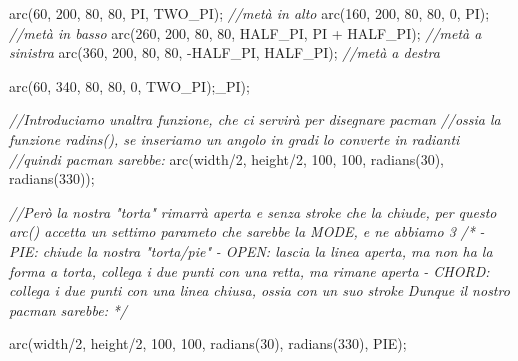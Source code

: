 \documentclass[
]{article}
\newenvironment{Shaded}{}{}
\newcommand{\CommentTok}[1]{\textcolor[rgb]{0.38,0.63,0.69}{\textit{#1}}}
\newcommand{\DecValTok}[1]{\textcolor[rgb]{0.25,0.63,0.44}{#1}}
\newcommand{\FunctionTok}[1]{\textcolor[rgb]{0.02,0.16,0.49}{#1}}
\newcommand{\NormalTok}[1]{#1}
\newcommand{\OperatorTok}[1]{\textcolor[rgb]{0.40,0.40,0.40}{#1}}
\begin{document}
\begin{Shaded}
\begin{Highlighting}[]
\FunctionTok{arc}\OperatorTok{(}\DecValTok{60}\OperatorTok{,} \DecValTok{200}\OperatorTok{,} \DecValTok{80}\OperatorTok{,} \DecValTok{80}\OperatorTok{,}\NormalTok{ PI}\OperatorTok{,}\NormalTok{ TWO\_PI}\OperatorTok{);} \CommentTok{//metà in alto}
\FunctionTok{arc}\OperatorTok{(}\DecValTok{160}\OperatorTok{,} \DecValTok{200}\OperatorTok{,} \DecValTok{80}\OperatorTok{,} \DecValTok{80}\OperatorTok{,} \DecValTok{0}\OperatorTok{,}\NormalTok{ PI}\OperatorTok{);} \CommentTok{//metà in basso}
\FunctionTok{arc}\OperatorTok{(}\DecValTok{260}\OperatorTok{,} \DecValTok{200}\OperatorTok{,} \DecValTok{80}\OperatorTok{,} \DecValTok{80}\OperatorTok{,}\NormalTok{ HALF\_PI}\OperatorTok{,}\NormalTok{ PI }\OperatorTok{+}\NormalTok{ HALF\_PI}\OperatorTok{);} \CommentTok{//metà a sinistra}
\FunctionTok{arc}\OperatorTok{(}\DecValTok{360}\OperatorTok{,} \DecValTok{200}\OperatorTok{,} \DecValTok{80}\OperatorTok{,} \DecValTok{80}\OperatorTok{,} \OperatorTok{{-}}\NormalTok{HALF\_PI}\OperatorTok{,}\NormalTok{ HALF\_PI}\OperatorTok{);} \CommentTok{//metà a destra}

\FunctionTok{arc}\OperatorTok{(}\DecValTok{60}\OperatorTok{,} \DecValTok{340}\OperatorTok{,} \DecValTok{80}\OperatorTok{,} \DecValTok{80}\OperatorTok{,} \DecValTok{0}\OperatorTok{,}\NormalTok{ TWO\_PI}\OperatorTok{);}\NormalTok{\_PI)}\OperatorTok{;}


\CommentTok{//Introduciamo un\textquotesingle{}altra funzione, che ci servirà per disegnare pacman}
\CommentTok{//ossia la funzione \textquotesingle{}radins()\textquotesingle{}, se inseriamo un angolo in gradi lo converte in radianti}
\CommentTok{//quindi pacman sarebbe:}
\FunctionTok{arc}\OperatorTok{(}\NormalTok{width}\OperatorTok{/}\DecValTok{2}\OperatorTok{,}\NormalTok{ height}\OperatorTok{/}\DecValTok{2}\OperatorTok{,} \DecValTok{100}\OperatorTok{,} \DecValTok{100}\OperatorTok{,} \FunctionTok{radians}\OperatorTok{(}\DecValTok{30}\OperatorTok{),} \FunctionTok{radians}\OperatorTok{(}\DecValTok{330}\OperatorTok{));}


\CommentTok{//Però la nostra "torta" rimarrà aperta e senza stroke che la chiude, per questo \textquotesingle{}arc()\textquotesingle{} accetta un settimo parameto che sarebbe la MODE, e ne abbiamo 3}
\CommentTok{/*}
\CommentTok{{-} PIE: chiude la nostra "torta/pie"}
\CommentTok{{-} OPEN: lascia la linea aperta, ma non ha la forma a torta, collega i due punti con una retta, ma rimane aperta}
\CommentTok{{-} CHORD: collega i due punti con una linea chiusa, ossia con un suo stroke}
\CommentTok{Dunque il nostro pacman sarebbe:}
\CommentTok{*/}

\FunctionTok{arc}\OperatorTok{(}\NormalTok{width}\OperatorTok{/}\DecValTok{2}\OperatorTok{,}\NormalTok{ height}\OperatorTok{/}\DecValTok{2}\OperatorTok{,} \DecValTok{100}\OperatorTok{,} \DecValTok{100}\OperatorTok{,} \FunctionTok{radians}\OperatorTok{(}\DecValTok{30}\OperatorTok{),} \FunctionTok{radians}\OperatorTok{(}\DecValTok{330}\OperatorTok{),}\NormalTok{ PIE}\OperatorTok{);}
\end{Highlighting}
\end{Shaded}
\end{document}
